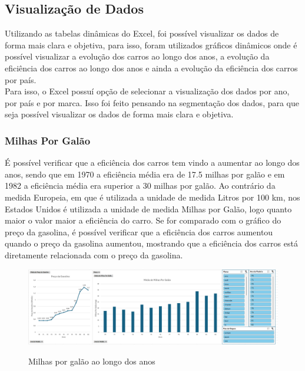 \documentclass[a4paper]{article}
\begin{document}
\subsection{Visualização de Dados}
Utilizando as tabelas dinâmicas do Excel, foi possível visualizar os dados de forma mais clara e objetiva,
para isso, foram utilizados gráficos dinâmicos onde é possível visualizar a evolução dos carros ao longo dos anos,
a evolução da eficiência dos carros ao longo dos anos e ainda a evolução da eficiência dos carros por país.
\\
Para isso, o Excel possuí opção de selecionar a visualização dos dados por ano, por país e por marca.
Isso foi feito pensando na segmentação dos dados, para que seja possível visualizar os dados de forma mais clara e objetiva.


\subsubsection{Milhas Por Galão}
É possível verificar que a eficiência dos carros tem vindo a aumentar ao longo dos anos,
sendo que em 1970 a eficiência média era de 17.5 milhas por galão e em 1982 a eficiência média 
era superior a 30 milhas por galão. Ao contrário da medida Europeia, em que é utilizada a unidade de medida
Litros por 100 km, nos Estados Unidos é utilizada a unidade de medida Milhas por Galão, logo quanto maior o valor
maior a eficiência do carro.
Se for comparado com o gráfico do preço da gasolina, é possível verificar que a eficiência dos carros aumentou
quando o preço da gasolina aumentou, mostrando que a eficiência dos carros está diretamente relacionada com o preço da gasolina.

\begin{figure}[h!]
    \raggedright
    \includegraphics[width=1.2\textwidth]{Recursos/MilhasPorGalaoGrafico.png} %
    \vspace{0.5cm}
    \label{fig:mpg}
    \caption{Milhas por galão ao longo dos anos}
\end{figure}
\newpage
\end{document}
